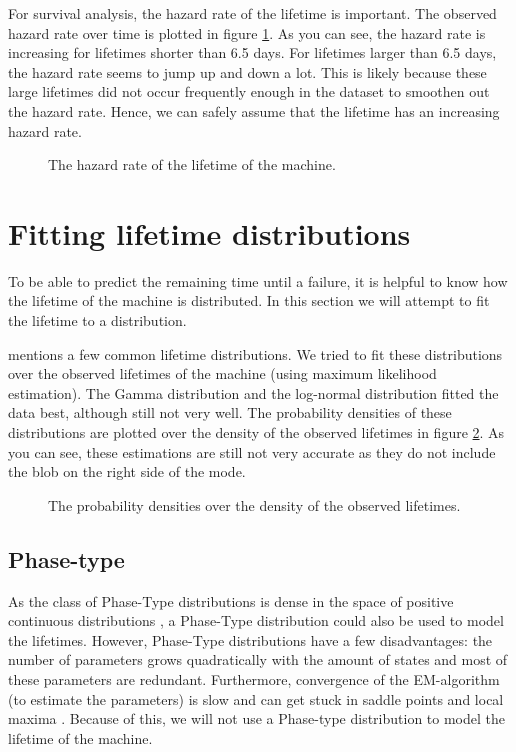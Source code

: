 For survival analysis, the hazard rate of the lifetime is important.
The observed hazard rate over time is plotted in figure \ref{figure:hazard}.
As you can see, the hazard rate is increasing for lifetimes shorter than 6.5 days.
For lifetimes larger than 6.5 days, the hazard rate seems to jump up and down a lot.
This is likely because these large lifetimes did not occur frequently enough in the dataset to smoothen out the hazard rate.
Hence, we can safely assume that the lifetime has an increasing hazard rate.
\begin{figure}[H]
	\centering
	\setlength{}

\caption{The hazard rate of the lifetime of the machine.}
\label{figure:hazard}
\end{figure}

\section{Fitting lifetime distributions}
To be able to predict the remaining time until a failure, it is helpful to know how the lifetime of the machine is distributed.
In this section we will attempt to fit the lifetime to a distribution.

\cite{Lai2006} mentions a few common lifetime distributions.
We tried to fit these distributions over the observed lifetimes of the machine (using maximum likelihood estimation).
The Gamma distribution and the log-normal distribution fitted the data best, although still not very well.
The probability densities of these distributions are plotted over the density of the observed lifetimes in figure \ref{figure:fits}.
As you can see, these estimations are still not very accurate as they do not include the blob on the right side of the mode.

\begin{figure}[H]\label{figure:fits}
	\centering
	\setlength{}
	
	\caption{The probability densities over the density of the observed lifetimes.}
\end{figure}
\subsection{Phase-type}
As the class of Phase-Type distributions is dense in the space of positive continuous distributions \cite{Ocinneide1999}, a Phase-Type distribution could also be used to model the lifetimes.
However, Phase-Type distributions have a few disadvantages:
the number of parameters grows quadratically with the amount of states and most of these parameters are redundant.
Furthermore, convergence of the EM-algorithm (to estimate the parameters) is slow and can get stuck in saddle points and local maxima \cite{Asmussen1996}.
Because of this, we will not use a Phase-type distribution to model the lifetime of the machine.

